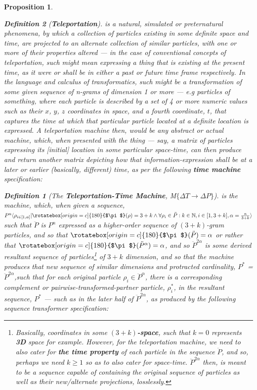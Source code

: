 \documentclass[a4paper, 18pt]{book} %
\newtheorem{defn}{Definition}
\newtheorem{prop}{Proposition}
\newcommand{\invpi}{\rotatebox[origin=c]{180}{$\pi$}}
\begin{document}
\begin{appendices}
\begin{prop}
\begin{defn}[\textbf{Teleportation}]
\label{DEFTELEPORTATION}
 is a natural, simulated or preternatural phenomena, by which a collection of particles existing in some definite space and time, are projected to an alternate collection of similar particles, with one or more of their properties altered --- in the case of conventional concepts of teleportation, such might mean expressing \textit{a thing} that is existing at the present time, as it were or shall be in either a past or future time frame respectively. In the language and calculus of transformatics, such might be a transformation of some given sequence of \textit{n}-grams of dimension 1 or more --- e.g particles of something, where each particle is described by a set of 4 or more numeric values such as their $x$, $y$, $z$ coordinates in space, and a fourth coordinate, $t$, that captures the time at which that particular particle located at a definite location is expressed. A teleportation machine then, would be any abstract or \textit{actual} machine, which, when presented with \textit{the thing} --- say, a matrix of particles expressing its [initial] location in some particular space-time, can then produce and return another matrix depicting how that information-expression shall be at a later or earlier (basically, different) time, as per the following \textbf{time machine} specification:
 
 \vspace{1em}

\begin{defn}[The \textbf{Teleportation-Time Machine}, M$\{\Delta T \rightarrow \Delta P\}$] 
\label{DEFTIMEMACHINE}
is the machine, which, when given a sequence, $P^n\langle \rho_{i \in [1,\alpha]} | \invpi(\rho) = 3+k \land \forall \rho_i \in \ddot{P} : k \in \mathbb{N}, i \in [1,3+k], \alpha = \frac{n}{3+k} \rangle$ such that $\ddot{P}$ is $P^n$ expressed as a higher-order sequence of $(3+k)$-gram particles, and so that $\invpi(\ddot{P})=\alpha$ or rather that $\invpi(\ddot{P}^\alpha)=\alpha$, and so $\ddot{P}^{2\alpha}$ is some derived resultant sequence of particles\footnote{Basically, coordinates in some \textbf{$(3+k)$-space}, such that $k = 0$ represents \textbf{3D} space for example. However, for the teleportation machine, we need to also cater for \textbf{the time property} of each particle in the sequence $\ddot{P}$, and so, perhaps we need $k \geq 1$ so as to also cater for space-time. $\ddot{P}^{2\alpha}$ then, is meant to be a sequence capable of containing the original sequence of particles as well as their new/alternate projections, losslessly.} of $3+k$ dimension, and so that the machine produces that new sequence of similar dimensions and protracted cardinality, $P^*$ = $\ddot{P}^{2\alpha}$,such that for each original particle $\rho_i \in \ddot{P}^{\alpha}$, there is a corresponding complement or pairwise-transformed-partner particle, $\rho^*_i$, in the resultant sequence, $P^*$ --- such as in the later half of $\ddot{P}^{2\alpha}$, as produced by the following sequence transformer specification:\\


\end{defn}
\end{defn}
\end{prop}
\end{appendices}
\end{document}
